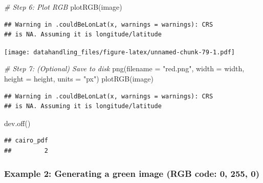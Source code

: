 \documentclass[
  12pt,
]{style/krantz}
\newenvironment{Shaded}{\begin{snugshade}}{\end{snugshade}}
\newcommand{\AttributeTok}[1]{\textcolor[rgb]{0.77,0.63,0.00}{#1}}
\newcommand{\CommentTok}[1]{\textcolor[rgb]{0.56,0.35,0.01}{\textit{#1}}}
\newcommand{\FunctionTok}[1]{\textcolor[rgb]{0.00,0.00,0.00}{#1}}
\newcommand{\NormalTok}[1]{#1}
\newcommand{\StringTok}[1]{\textcolor[rgb]{0.31,0.60,0.02}{#1}}
\begin{document}
\begin{Shaded}
\begin{Highlighting}[]
\CommentTok{\# Step 6: Plot RGB}
\FunctionTok{plotRGB}\NormalTok{(image)}
\end{Highlighting}
\end{Shaded}

\begin{verbatim}
## Warning in .couldBeLonLat(x, warnings = warnings): CRS
## is NA. Assuming it is longitude/latitude
\end{verbatim}

\texttt{[image: datahandling\_files/figure-latex/unnamed-chunk-79-1.pdf]}

\begin{Shaded}
\begin{Highlighting}[]
\CommentTok{\# Step 7: (Optional) Save to disk}
\FunctionTok{png}\NormalTok{(}\AttributeTok{filename =} \StringTok{"red.png"}\NormalTok{, }\AttributeTok{width =}\NormalTok{ width, }\AttributeTok{height =}\NormalTok{ height, }\AttributeTok{units =} \StringTok{"px"}\NormalTok{)}
\FunctionTok{plotRGB}\NormalTok{(image)}
\end{Highlighting}
\end{Shaded}

\begin{verbatim}
## Warning in .couldBeLonLat(x, warnings = warnings): CRS
## is NA. Assuming it is longitude/latitude
\end{verbatim}

\begin{Shaded}
\begin{Highlighting}[]
\FunctionTok{dev.off}\NormalTok{()}
\end{Highlighting}
\end{Shaded}

\begin{verbatim}
## cairo_pdf 
##         2
\end{verbatim}

\hypertarget{example-2-generating-a-green-image-rgb-code-0-255-0}{%
\subsubsection{Example 2: Generating a green image (RGB code: 0, 255, 0)}\label{example-2-generating-a-green-image-rgb-code-0-255-0}}
\end{document}

